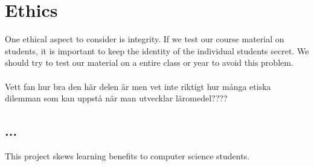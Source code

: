 \section{Ethics}
One ethical aspect to consider is integrity. If we test our course material on students, it is important to keep the identity of the individual students secret. We should try to test our material on a entire class or year to avoid this problem.
\\ \\
Vett fan hur bra den här delen är men vet inte riktigt hur många etiska dilemman som kan uppstå när man utvecklar läromedel????

\subsection{...}
This project skews learning benefits to computer science students.

\iffalse

Samhälleliga och etiska aspekter
•  Bedömning av om samhälleliga och etiska aspekter behöver beaktas och analyseras vidare i uppsatsen/rapporten. 
•  Om svaret är nej skall detta motiveras.
•  Se bilaga 7 –Beslutsanalysmodell: 5 frågor 
•  Se de digitala resurser som finns på Studentportalens sidor om kandidatarbetet.


\fi
